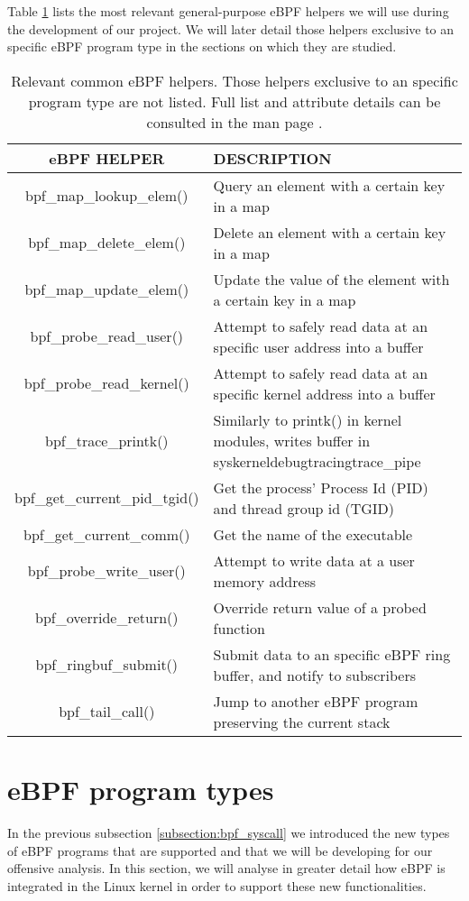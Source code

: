 Table \ref{table:ebpf_helpers} lists the most relevant general-purpose eBPF helpers we will use during the development of our project. We will later detail those helpers exclusive to an specific eBPF program type in the sections on which they are studied.

\begin{table}[htbp]
\begin{tabular}{|c|>{\centering\arraybackslash}p{8cm}|}
\hline
\textbf{eBPF HELPER}& \textbf{DESCRIPTION}\\
\hline
\hline
bpf\_map\_lookup\_elem() & Query an element with a certain key in a map\\
\hline
bpf\_map\_delete\_elem() & Delete an element with a certain key in a map\\
\hline
bpf\_map\_update\_elem() & Update the value of the element with a certain key in a map\\
\hline
bpf\_probe\_read\_user() & Attempt to safely read data at an specific user address into a buffer\\
\hline
bpf\_probe\_read\_kernel() & Attempt to safely read data at an specific kernel address into a buffer\\
\hline
bpf\_trace\_printk() & Similarly to printk() in kernel modules, writes buffer in \/sys\/kernel\/debug\/tracing\/trace\_pipe\\
\hline
bpf\_get\_current\_pid\_tgid() & Get the process' Process Id (PID) and thread group id (TGID)\\
\hline
bpf\_get\_current\_comm() & Get the name of the executable\\
\hline
bpf\_probe\_write\_user() & Attempt to write data at a user memory address\\
\hline
bpf\_override\_return() & Override return value of a probed function\\
\hline
bpf\_ringbuf\_submit() & Submit data to an specific eBPF ring buffer, and notify to subscribers\\
\hline
bpf\_tail\_call() & Jump to another eBPF program preserving the current stack\\
\hline
\end{tabular}
\caption{Relevant common eBPF helpers. Those helpers exclusive to an specific program type are not listed. Full list and attribute details can be consulted in the man page \cite{ebpf_helpers}.}
\label{table:ebpf_helpers}
\end{table}


\section{eBPF program types} \label{section:ebpf_prog_types}
In the previous subsection \ref{subsection:bpf_syscall} we introduced the new types of eBPF programs that are supported and that we will be developing for our offensive analysis. In this section, we will analyse in greater detail how eBPF is integrated in the Linux kernel in order to support these new functionalities.

